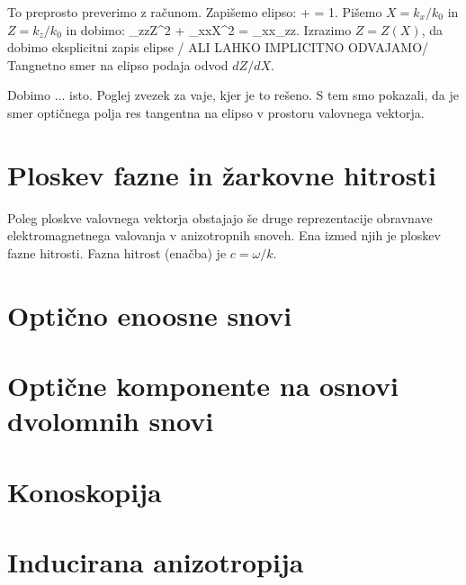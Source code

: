 To preprosto preverimo z računom. Zapišemo elipso:
\beq
{}+  = 1.
\eeq
Pišemo $X = k_x/k_0$ in $Z = k_z/k_0$
in dobimo:
\beq
\varepsilon_{zz}Z^2 + \varepsilon_{xx}X^2 = \varepsilon_{xx}\varepsilon_{zz}.
\eeq
Izrazimo $Z= Z(X)$, da dobimo eksplicitni zapis elipse / ALI LAHKO IMPLICITNO ODVAJAMO/
Tangnetno smer na elipso podaja odvod $dZ/dX$.  

Dobimo ... isto. Poglej zvezek za vaje, kjer je to rešeno. S tem smo pokazali, da 
je smer optičnega polja res tangentna na elipso v prostoru valovnega vektorja. 


\section{Ploskev fazne in žarkovne hitrosti}
Poleg ploskve valovnega vektorja obstajajo še druge reprezentacije obravnave
elektromagnetnega valovanja v anizotropnih snoveh. Ena izmed njih je ploskev
fazne hitrosti. Fazna hitrost (enačba) je $c = \omega/k$. 


\section{Optično enoosne snovi}
\section{Optične komponente na osnovi dvolomnih snovi}
\section{Konoskopija}
\section{Inducirana anizotropija}
